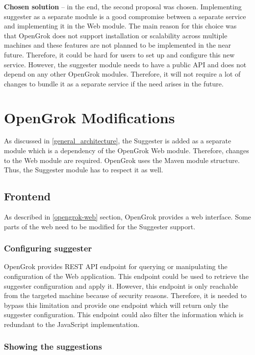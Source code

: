 \textbf{Chosen solution} – in the end, the second proposal was chosen. Implementing suggester as a separate module is a
good compromise between a separate service and implementing it in the Web module. The main reason for this choice was that
OpenGrok does not support installation or scalability across multiple machines and these features are not planned to be
implemented in the near future. Therefore, it could be hard for users to set up and configure this new service.
However, the suggester module needs to have a public API and does not depend on any other OpenGrok modules. Therefore, it
will not require a lot of changes to bundle it as a separate service if the need arises in the future.

\section{OpenGrok Modifications}
\label{opengrok_modifications}

As discussed in \ref{general_architecture}, the Suggester is added as a separate module which is a dependency of the
OpenGrok Web module. Therefore, changes to the Web module are required. OpenGrok uses the Maven module structure.
Thus, the Suggester module has to respect it as well.

\subsection{Frontend}

As described in \ref{opengrok-web} section, OpenGrok provides a web interface. Some parts of the web need to be modified
for the Suggester support.

\subsubsection{Configuring suggester}
OpenGrok provides REST API endpoint for querying or manipulating the configuration of the Web application.
This endpoint could be used to retrieve the suggester configuration and apply it.
However, this endpoint is only reachable from the targeted machine because of security reasons.
Therefore, it is needed to bypass this limitation and provide one endpoint which will return only the suggester configuration.
This endpoint could also filter the information which is redundant to the JavaScript implementation.

\subsubsection{Showing the suggestions}
\label{showing_suggestions}

